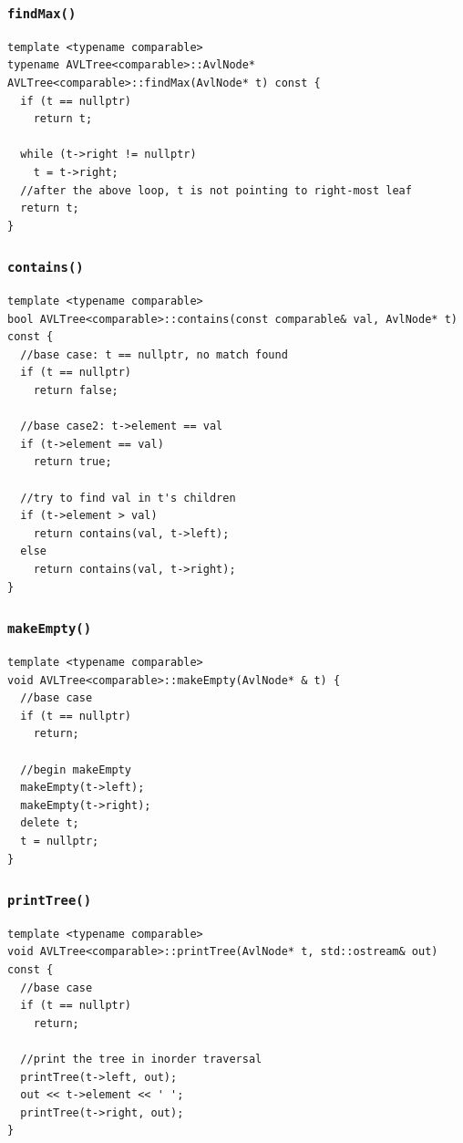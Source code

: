 \documentclass[12pt]{book}
\begin{document}
\subsubsection{\texttt{findMax()}}
\label{sec:orgd555630}
\begin{verbatim}
template <typename comparable>
typename AVLTree<comparable>::AvlNode* AVLTree<comparable>::findMax(AvlNode* t) const {
  if (t == nullptr)
    return t;

  while (t->right != nullptr)
    t = t->right;
  //after the above loop, t is not pointing to right-most leaf
  return t;   
}
\end{verbatim}
\subsubsection{\texttt{contains()}}
\label{sec:org8a59429}
\begin{verbatim}
template <typename comparable>
bool AVLTree<comparable>::contains(const comparable& val, AvlNode* t) const {
  //base case: t == nullptr, no match found
  if (t == nullptr)
    return false;

  //base case2: t->element == val
  if (t->element == val)
    return true;

  //try to find val in t's children
  if (t->element > val)
    return contains(val, t->left);
  else 
    return contains(val, t->right);
}
\end{verbatim}
\subsubsection{\texttt{makeEmpty()}}
\label{sec:orgad266c4}
\begin{verbatim}
template <typename comparable>
void AVLTree<comparable>::makeEmpty(AvlNode* & t) {
  //base case 
  if (t == nullptr)
    return;

  //begin makeEmpty
  makeEmpty(t->left);
  makeEmpty(t->right);
  delete t;
  t = nullptr;
}
\end{verbatim}
\subsubsection{\texttt{printTree()}}
\label{sec:org206b1c6}
\begin{verbatim}
template <typename comparable>
void AVLTree<comparable>::printTree(AvlNode* t, std::ostream& out) const {
  //base case 
  if (t == nullptr)
    return;

  //print the tree in inorder traversal
  printTree(t->left, out);
  out << t->element << ' ';
  printTree(t->right, out);
}
\end{verbatim}
\end{document}
